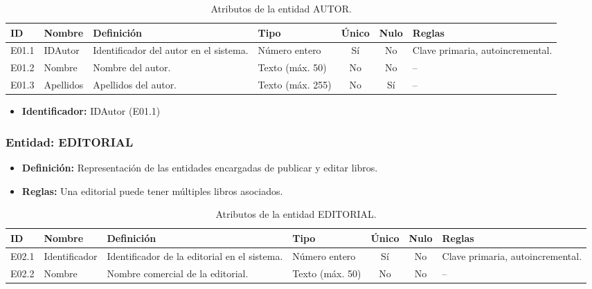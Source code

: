 	\begin{table}[H]
		\centering
		\caption{Atributos de la entidad AUTOR.}
		\label{tab:dict_autor}
		\small
		\begin{tabularx}{\textwidth}{l l X l c c X}
			\toprule
			\textbf{ID} & \textbf{Nombre} & \textbf{Definición} & \textbf{Tipo} & \textbf{Único} & \textbf{Nulo} & \textbf{Reglas} \\
			\midrule
			E01.1 & IDAutor & Identificador del autor en el sistema. & Número entero & Sí & No & Clave primaria, autoincremental. \\
			\addlinespace
			E01.2 & Nombre & Nombre del autor. & Texto (máx. 50) & No & No & -- \\
			\addlinespace
			E01.3 & Apellidos & Apellidos del autor. & Texto (máx. 255) & No & Sí & -- \\
			\bottomrule
		\end{tabularx}
	\end{table}
	
	\begin{itemize}
		\item\textbf{Identificador:} IDAutor (E01.1)
	\end{itemize}
	
	\subsubsection{Entidad: EDITORIAL}
	\begin{itemize}
		\item\textbf{Definición:} Representación de las entidades encargadas de publicar y editar libros.
		\item\textbf{Reglas:} Una editorial puede tener múltiples libros asociados.
	\end{itemize}
	
	\begin{table}[H]
		\centering
		\caption{Atributos de la entidad EDITORIAL.}
		\label{tab:dict_editorial}
		\small
		\begin{tabularx}{\textwidth}{l l X l c c X}
			\toprule
			\textbf{ID} & \textbf{Nombre} & \textbf{Definición} & \textbf{Tipo} & \textbf{Único} & \textbf{Nulo} & \textbf{Reglas} \\
			\midrule
			E02.1 & Identificador & Identificador de la editorial en el sistema. & Número entero & Sí & No & Clave primaria, autoincremental. \\
			\addlinespace
			E02.2 & Nombre & Nombre comercial de la editorial. & Texto (máx. 50) & No & No & -- \\
			\bottomrule
		\end{tabularx}
	\end{table}
	
